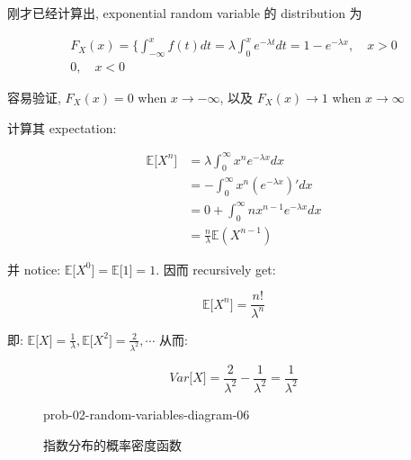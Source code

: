 刚才已经计算出, exponential random variable 的 distribution 为

\[\begin{matrix}
{\mathit{F}_{\mathit{X}}(\mathit{x}) = \{\int_{- \infty}^{\mathit{x}}\mathit{f}(\mathit{t})\mathit{d}\mathit{t} = \mathit{\lambda}\int_{0}^{\mathit{x}}\mathit{e}^{- \mathit{\lambda}\mathit{t}}\mathit{d}\mathit{t} = 1 - \mathit{e}^{- \mathit{\lambda}\mathit{x}},\quad\mathit{x} > 0} \\
{0,\quad\mathit{x} < 0}
\end{matrix}\]

容易验证, \(\mathit{F}_{\mathit{X}}(\mathit{x}) = 0\) when \(\mathit{x}\rightarrow - \infty\), 以及 \(\mathit{F}_{\mathit{X}}(\mathit{x})\rightarrow 1\) when \(\mathit{x}\rightarrow\infty\)

计算其 expectation:

\[\begin{matrix}
{\mathbb{E}\lbrack\mathit{X}^{\mathit{n}}\rbrack} & {= \mathit{\lambda}\int_{0}^{\infty}\mathit{x}^{\mathit{n}}\mathit{e}^{- \mathit{\lambda}\mathit{x}}\mathit{d}\mathit{x}} \\
 & {= - \int_{0}^{\infty}\mathit{x}^{\mathit{n}}(\mathit{e}^{- \mathit{\lambda}\mathit{x}})'\mathit{d}\mathit{x}} \\
 & {= 0 + \int_{0}^{\infty}\mathit{n}\mathit{x}^{\mathit{n} - 1}\mathit{e}^{- \mathit{\lambda}\mathit{x}}\mathit{d}\mathit{x}} \\
 & {= \frac{\mathit{n}}{\mathit{\lambda}}\mathbb{E}(\mathit{X}^{\mathit{n} - 1})}
\end{matrix}\]

并 notice: \(\mathbb{E}\lbrack\mathit{X}^{0}\rbrack = \mathbb{E}\lbrack 1\rbrack = 1\). 因而 recursively get:

\[\mathbb{E}\lbrack\mathit{X}^{\mathit{n}}\rbrack = \frac{\mathit{n}!}{\mathit{\lambda}^{\mathit{n}}}\]

即: \(\mathbb{E}\lbrack\mathit{X}\rbrack = \frac{1}{\mathit{\lambda}},\mathbb{E}\lbrack\mathit{X}^{2}\rbrack = \frac{2}{\mathit{\lambda}^{2}},\cdots\) 从而:

\[\mathit{V}\mathit{a}\mathit{r}\lbrack\mathit{X}\rbrack = \frac{2}{\mathit{\lambda}^{2}} - \frac{1}{\mathit{\lambda}^{2}} = \frac{1}{\mathit{\lambda}^{2}}\]

\begin{figure}[htbp]
\centering
\begin{qldrawing}
\csname prob-02-random-variables-diagram-06\endcsname
\end{qldrawing}

\caption{指数分布的概率密度函数}

\label{fig-prob-02-random-variables-diagram-06}

\end{figure}

